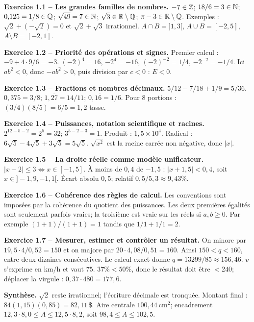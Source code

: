 \begin{answerbox}
\textbf{Exercice 1.1 -- Les grandes familles de nombres.} $-7\in\mathbb{Z}$; $18/6=3\in\mathbb{N}$; $0{,}125=1/8\in\mathbb{Q}$; $\sqrt{49}=7\in\mathbb{N}$; $\sqrt3\in\mathbb{R}\setminus\mathbb{Q}$; $\pi-3\in\mathbb{R}\setminus\mathbb{Q}$. Exemples : $\sqrt2+(-\sqrt2)=0$ et $\sqrt2+\sqrt3$ irrationnel. $A\cap B=]1,3[$, $A\cup B=[-2,5]$, $A\setminus B=[-2,1]$.\par
\textbf{Exercice 1.2 -- Priorité des opérations et signes.} Premier calcul : $-9+4\cdot9/6=-3$. $(-2)^4=16$, $-2^4=-16$, $(-2)^{-2}=1/4$, $-2^{-2}=-1/4$. Ici $ab^2<0$, donc $-ab^2>0$, puis division par $c<0$ : $E<0$.\par
\textbf{Exercice 1.3 -- Fractions et nombres décimaux.} $5/12-7/18+1/9=5/36$. $0{,}375=3/8$; $1{,}\overline{27}=14/11$; $0{,}1\overline6=1/6$. Pour $8$ portions : $(3/4)(8/5)=6/5=1{,}2$ tasse.\par
\textbf{Exercice 1.4 -- Puissances, notation scientifique et racines.} $2^{12-5-2}=2^5=32$; $3^{5-2-3}=1$. Produit : $1{,}5\times10^4$. Radical : $6\sqrt5-4\sqrt5+3\sqrt5=5\sqrt5$. $\sqrt{x^2}$ est la racine carrée non négative, donc $|x|$.\par
\textbf{Exercice 1.5 -- La droite réelle comme modèle unificateur.} $|x-2|\le3\iff x\in[-1,5]$. À moins de $0{,}4$ de $-1{,}5$ : $|x+1{,}5|<0{,}4$, soit $x\in]-1{,}9,-1{,}1[$. Écart absolu $0{,}5$; relatif $0{,}5/5{,}3\approx9{,}43\%$.\par
\textbf{Exercice 1.6 -- Cohérence des règles de calcul.} Les conventions sont imposées par la cohérence du quotient des puissances. Les deux premières égalités sont seulement parfois vraies; la troisième est vraie sur les réels si $a,b\ge0$. Par exemple $(1+1)/(1+1)=1$ tandis que $1/1+1/1=2$.\par
\textbf{Exercice 1.7 -- Mesurer, estimer et contrôler un résultat.} On minore par $19{,}5\cdot4/0{,}52=150$ et on majore par $20\cdot4{,}08/0{,}51=160$. Ainsi $150<q<160$, entre deux dizaines consécutives. Le calcul exact donne $q=13299/85\approx156{,}46$. $v$ s'exprime en km/h et vaut $75$. $37\%<50\%$, donc le résultat doit être $<240$; déplacer la virgule : $0{,}37\cdot480=177{,}6$.\par
\medskip\textbf{Synthèse.} $\sqrt2$ reste irrationnel; l'écriture décimale est tronquée. Montant final : $84(1{,}15)(0{,}85)=82{,}11\,$\$. Aire centrale $100{,}44\ \mathrm{cm}^2$; encadrement $12{,}3\cdot8{,}0\le A\le12{,}5\cdot8{,}2$, soit $98{,}4\le A\le102{,}5$.
\end{answerbox}
